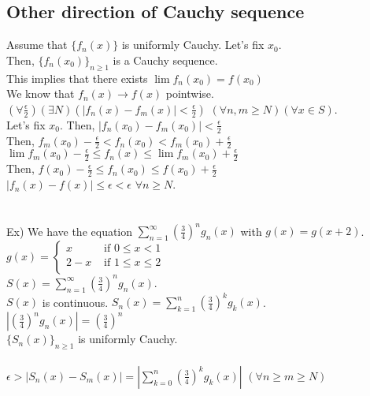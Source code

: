 \documentclass[11pt]{article}
\begin{document}
	\subsection*{Other direction of Cauchy sequence}
		Assume that $\{f_n(x)\}$ is uniformly Cauchy. Let's fix $x_0$.\\
		Then, $\{f_n(x_0)\}_{n \ge 1}$ is a Cauchy sequence. \\
		This implies that there exists $\lim f_n(x_0) = f(x_0)$ \\
		We know that $f_n(x) \to f(x)$ pointwise.\\
		$(\forall \frac{\epsilon}{2})(\exists N)(|f_n(x) - f_m(x)| < 
		\frac{\epsilon}{2})$ $(\forall n,m \ge N)(\forall x \in S)$.\\
		Let's fix $x_0$. Then, $|f_n(x_0) - f_m(x_0)| < \frac{\epsilon}{2}$\\
		Then, $f_m(x_0) - \frac{\epsilon}{2} <  f_n(x_0) < f_m(x_0) + 
		\frac{\epsilon}{2}$\\
		$\lim f_m(x_0) - \frac{\epsilon}{2} \le  f_n(x) \le \lim f_m(x_0) + 
		\frac{\epsilon}{2}$\\
		Then, $f(x_0) - \frac{\epsilon}{2} \le f_n(x_0) \le f(x_0) + 
		\frac{\epsilon}{2}$\\
		$|f_n(x) - f(x)| \le \epsilon < \epsilon$ $\forall n \ge N$.\\\\\\
%
	Ex) We have the equation $\sum_{n = 1}^{\infty}{\left(\frac{3}{4}\right)^n
	g_n(x)}$ with $g(x) = g(x+2)$.\\
	$g(x) = \begin{cases} x & \text{ if } 0 \le x < 1\\ 
		2 - x & \text{ if } 1 \le x \le 2\\
	\end{cases}$\\
	$S(x) = \sum_{n = 1}^{\infty} \left(\frac{3}{4}\right)^n g_n(x)$.\\
	$S(x)$ is continuous. $S_n(x) = \sum_{k = 1}^n \left(\frac{3}{4}\right)^k
	g_k(x)$.\\
	$\left|\left(\frac{3}{4}\right)^n g_n(x) \right| = \left(\frac{3}{4}\right)
	^n$\\
	$\{S_n(x)\}_{n \ge 1}$ is uniformly Cauchy.\\\\
	$\epsilon > |S_n(x) - S_m(x)| = \left| \sum_{k = 0}^n \left(\frac{3}{4}
	\right)^k g_k(x)\right|$ $(\forall n \ge m \ge N)$\\\\\\
\end{document}

